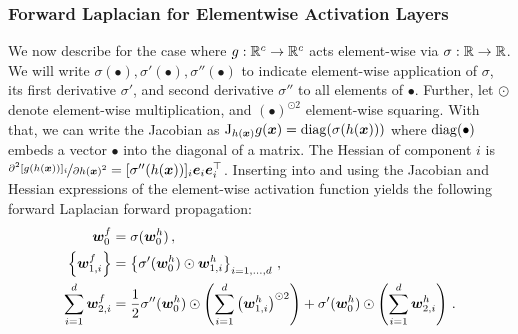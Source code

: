 \subsubsection{Forward Laplacian for Elementwise Activation Layers}
We now describe  for the case where $g: {\mathbb{R}}^c \to {\mathbb{R}}^c$ acts element-wise via $\sigma: {\mathbb{R}} \to {\mathbb{R}}$.
We will write $\sigma(\bullet), \sigma'(\bullet), \sigma''(\bullet)$ to indicate element-wise application of $\sigma$, its first derivative $\sigma'$, and second derivative $\sigma''$ to all elements of $\bullet$.
Further, let $\odot$ denote element-wise multiplication, and $(\bullet)^{\odot 2}$ element-wise squaring.
With that, we can write the Jacobian as $\mathrm{J}_{h({\bm{x}})}g({\bm{x}}) = \operatorname{diag}(\sigma(h({\bm{x}})))$ where $\operatorname{diag}(\bullet)$ embeds a vector $\bullet$ into the diagonal of a matrix.
The Hessian of component $i$ is $\nicefrac{\partial^2 [g(h({\bm{x}}))]_i}{\partial h({\bm{x}})^2} = [\sigma''(h({\bm{x}}))]_i {\bm{e}}_i {\bm{e}}_i^{\top}$.
Inserting  into  and using the Jacobian and Hessian expressions of the element-wise activation function yields the following forward Laplacian forward propagation:
\begin{subequations}
  \begin{align}
    {\bm{w}}_0^f
    &=
      \sigma({\bm{w}}_0^h)\,,
    \\
    \left\{ {\bm{w}}_{1,i}^f \right\}
    &=
      \left\{ \sigma'({\bm{w}}_0^h) \odot {\bm{w}}_{1,i}^h \right\}_{i=1, \dots, d}\,,
    \\
    \sum_{i=1}^d {\bm{w}}_{2,i}^f
    &=
      \frac{1}{2}
      \sigma''({\bm{w}}_0^h) \odot
      \left(
      \sum_{i=1}^d
      \left({\bm{w}}_{1,i}^h\right)^{\odot 2}
      \right)
      +
      \sigma'({\bm{w}}_0^h)
      \odot
      \left(
      \sum_{i=1}^d {\bm{w}}_{2,i}^h
      \right)\,.
  \end{align}
\end{subequations}

